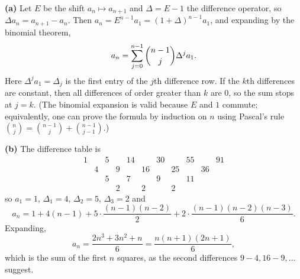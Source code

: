 \textbf{(a)} Let $E$ be the shift $a_n\mapsto a_{n+1}$ and $\Delta=E-1$ the difference operator, so $\Delta a_n=a_{n+1}-a_n$. Then $a_{n}=E^{n-1}a_1=(1+\Delta)^{n-1}a_1$, and expanding by the binomial theorem,
\[
a_n=\sum_{j=0}^{n-1}\dbinom{n-1}{j}\Delta^ja_1 .
\]
Here $\Delta^ja_1=\Delta_j$ is the first entry of the $j$th difference row. If the $k$th differences are constant, then all differences of order greater than $k$ are $0$, so the sum stops at $j=k$. (The binomial expansion is valid because $E$ and $1$ commute; equivalently, one can prove the formula by induction on $n$ using Pascal's rule $\binom{n}{j}=\binom{n-1}{j}+\binom{n-1}{j-1}$.)

\textbf{(b)} The difference table is
\[
\begin{array}{cccccccccccc}
1&&5&&14&&30&&55&&91\\
&4&&9&&16&&25&&36\\
&&5&&7&&9&&11\\
&&&2&&2&&2
\end{array}
\]
so $a_1=1$, $\Delta_1=4$, $\Delta_2=5$, $\Delta_3=2$ and
\[
a_n=1+4(n-1)+5\cdot\dfrac{(n-1)(n-2)}{2}+2\cdot\dfrac{(n-1)(n-2)(n-3)}{6}.
\]
Expanding,
\[
a_n=\dfrac{2n^3+3n^2+n}{6}=\boxed{\dfrac{n(n+1)(2n+1)}{6}},
\]
which is the sum of the first $n$ squares, as the second differences $9-4, 16-9,\dots$ suggest.
